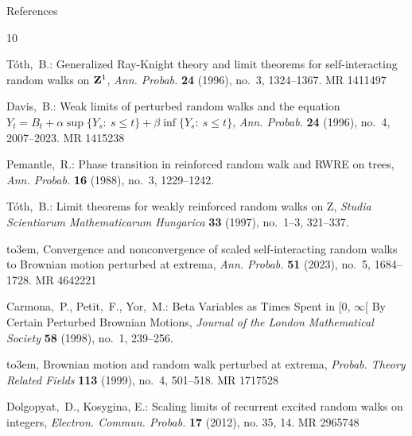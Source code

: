 \begin{mainbox}{References}
    \begingroup
\renewcommand{\section}[2]{}%
    \providecommand{\bysame}{\leavevmode\hbox to3em{\hrulefill}\thinspace}
\providecommand{\MR}{\relax\ifhmode\unskip\space\fi MR }
\providecommand{\MRhref}[2]{%
  \href{http://www.ams.org/mathscinet-getitem?mr=#1}{#2}
}
\providecommand{\href}[2]{#2}
\begin{thebibliography}{10}
        
        T\'{o}th,~B.: Generalized {R}ay-{K}night theory and limit theorems for self-interacting random walks on {${\bf Z}^1$}, \emph{Ann. Probab.} \textbf{24} (1996), no.~3, 1324--1367. \MR{1411497}
        
        Davis,~B.: Weak limits of perturbed random walks and the equation {$Y_t=B_t+\alpha\sup\{Y_s\colon\ s\leq t\}+\beta\inf\{Y_s\colon\ s\leq t\}$}, \emph{Ann. Probab.} \textbf{24} (1996), no.~4, 2007--2023. \MR{1415238}
        




        Pemantle,~R.: Phase transition in reinforced random walk and {RWRE} on trees, \emph{Ann. Probab.} \textbf{16} (1988), no.~3, 1229--1242. 

        T\'{o}th,~B.: Limit theorems for weakly reinforced random walks on {Z}, \emph{Studia Scientiarum Mathematicarum Hungarica} \textbf{33} (1997), no.~1--3, 321--337.

        \bysame, Convergence and nonconvergence of scaled self-interacting random walks to {B}rownian motion perturbed at extrema, \emph{Ann. Probab.} \textbf{51} (2023), no.~5, 1684--1728. \MR{4642221}

        Carmona,~P., Petit,~F., Yor,~M.: Beta Variables as Times Spent in [0, $\infty$[ By Certain Perturbed Brownian Motions, \emph{Journal of the London Mathematical Society} \textbf{58} (1998), no.~1, 239--256.

        \bysame, Brownian motion and random walk perturbed at extrema, \emph{Probab. Theory Related Fields} \textbf{113} (1999), no.~4, 501--518. \MR{1717528}

        
        Dolgopyat,~D., Kosygina, E.: Scaling limits of recurrent excited random walks on integers, \emph{Electron. Commun. Probab.} \textbf{17} (2012), no. 35, 14. \MR{2965748}


\end{thebibliography}
\end{mainbox}
